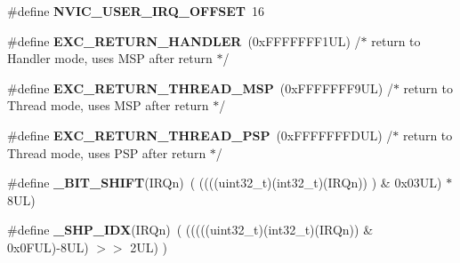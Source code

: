 \begin{DoxyCompactItemize}
\item 
\mbox{\label{group___c_m_s_i_s___core___n_v_i_c_functions_ga8045d905a5ca57437d8e6f71ffcb6df5}} 
\#define {\bfseries N\+V\+I\+C\+\_\+\+U\+S\+E\+R\+\_\+\+I\+R\+Q\+\_\+\+O\+F\+F\+S\+ET}~16
\item 
\mbox{\label{group___c_m_s_i_s___core___n_v_i_c_functions_gaa6fa2b10f756385433e08522d9e4632f}} 
\#define {\bfseries E\+X\+C\+\_\+\+R\+E\+T\+U\+R\+N\+\_\+\+H\+A\+N\+D\+L\+ER}~(0x\+F\+F\+F\+F\+F\+F\+F1\+U\+L)     /$\ast$ return to Handler mode, uses M\+S\+P after return                               $\ast$/
\item 
\mbox{\label{group___c_m_s_i_s___core___n_v_i_c_functions_gaea4703101b5e679f695e231f7ee72331}} 
\#define {\bfseries E\+X\+C\+\_\+\+R\+E\+T\+U\+R\+N\+\_\+\+T\+H\+R\+E\+A\+D\+\_\+\+M\+SP}~(0x\+F\+F\+F\+F\+F\+F\+F9\+U\+L)     /$\ast$ return to Thread mode, uses M\+S\+P after return                                $\ast$/
\item 
\mbox{\label{group___c_m_s_i_s___core___n_v_i_c_functions_ga9998daf0fbdf31dbc8f81cd604b58175}} 
\#define {\bfseries E\+X\+C\+\_\+\+R\+E\+T\+U\+R\+N\+\_\+\+T\+H\+R\+E\+A\+D\+\_\+\+P\+SP}~(0x\+F\+F\+F\+F\+F\+F\+F\+D\+U\+L)     /$\ast$ return to Thread mode, uses P\+S\+P after return                                $\ast$/
\item 
\mbox{\label{group___c_m_s_i_s___core___n_v_i_c_functions_ga53c75b28823441c6153269f0ecbed878}} 
\#define {\bfseries \+\_\+\+B\+I\+T\+\_\+\+S\+H\+I\+FT}(I\+R\+Qn)~(  ((((uint32\+\_\+t)(int32\+\_\+t)(I\+R\+Qn))         )      \&  0x03\+U\+L) $\ast$ 8\+U\+L)
\item 
\mbox{\label{group___c_m_s_i_s___core___n_v_i_c_functions_gaee4f7eb5d7e770ad51489dbceabb1755}} 
\#define {\bfseries \+\_\+\+S\+H\+P\+\_\+\+I\+DX}(I\+R\+Qn)~( (((((uint32\+\_\+t)(int32\+\_\+t)(I\+R\+Qn)) \& 0x0\+F\+U\+L)-\/8\+U\+L) $>$$>$    2\+U\+L)      )
\item 
\mbox{\label{group___c_m_s_i_s___core___n_v_i_c_functions_ga370ec4b1751a6a889d849747df3763a9}} 
$$
\end{DoxyCompactItemize}
